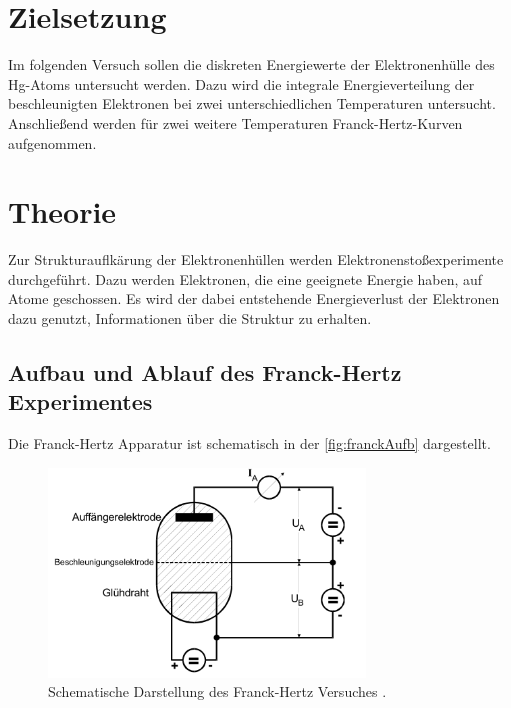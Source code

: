 \section{Zielsetzung}
\label{sec:Ziel}
Im folgenden Versuch sollen die diskreten Energiewerte der Elektronenhülle des Hg-Atoms untersucht werden. Dazu wird die integrale Energieverteilung
der beschleunigten Elektronen bei zwei unterschiedlichen Temperaturen untersucht. Anschließend werden für zwei weitere Temperaturen Franck-Hertz-Kurven aufgenommen.

\section{Theorie}
\label{sec:Theorie}

\noindent
Zur Strukturauflkärung der Elektronenhüllen werden Elektronenstoßexperimente durchgeführt. Dazu werden Elektronen, die eine geeignete Energie haben, auf Atome geschossen. Es wird
der dabei entstehende Energieverlust der Elektronen dazu genutzt, Informationen über die Struktur zu erhalten.

\subsection{Aufbau und Ablauf des Franck-Hertz Experimentes}
\label{subsec:aufbau}
Die Franck-Hertz Apparatur ist schematisch in der \autoref{fig:franckAufb} dargestellt.

\begin{figure}[H]
    \centering
    \includegraphics[width=0.75\textwidth]{data/FranckHertz.png}
    \caption{Schematische Darstellung des Franck-Hertz Versuches \cite{Anleitung601}.}
    \label{fig:franckAufb}
\end{figure}

